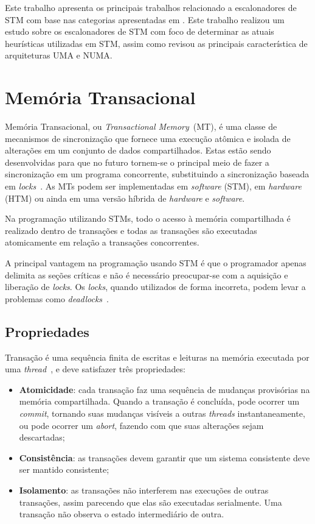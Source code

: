\documentclass[ti]{texufpel}
\begin{document}
Este trabalho apresenta os principais trabalhos relacionado a escalonadores de STM com base nas categorias apresentadas em \cite{sanzo17}. Este trabalho realizou um estudo sobre os escalonadores de STM com foco de determinar as atuais heurísticas utilizadas em STM, assim como revisou as principais característica de arquiteturas UMA e NUMA.

\chapter{Memória Transacional}

Memória Transacional, ou \emph{Transactional Memory}~(MT), é uma classe de mecanismos de sincronização que fornece uma execução atômica e isolada de alterações em um conjunto de dados compartilhados. Estas estão sendo desenvolvidas para que no futuro tornem-se o principal meio de fazer a sincronização em um programa concorrente, substituindo a sincronização baseada em \emph{locks}~\cite{herlihy06}. As MTs podem ser implementadas em \emph{software} (STM), em \emph{hardware} (HTM) ou ainda em uma versão híbrida de \emph{hardware} e \emph{software}.

Na programação utilizando STMs, todo o acesso à memória compartilhada é realizado dentro de transações e todas as transações são executadas atomicamente em relação a transações concorrentes.

A principal vantagem na programação usando STM é que o programador apenas delimita as seções críticas e não é necessário preocupar-se com a aquisição e liberação de \emph{locks}. Os \emph{locks}, quando utilizados de forma incorreta, podem levar a problemas como \emph{deadlocks}~\cite{bandeira10}.

\section{Propriedades}

Transação é uma sequência finita de escritas e leituras na memória executada por uma \emph{thread}~\cite{herlihy93}, e deve satisfazer três propriedades:

\begin{itemize}
\item \textbf{Atomicidade}: cada transação faz uma sequência de mudanças provisórias na memória compartilhada. Quando a transação é concluída, pode ocorrer um \emph{commit}, tornando suas mudanças visíveis a outras \emph{threads} instantaneamente, ou pode ocorrer um \emph{abort}, fazendo com que suas alterações sejam descartadas;

\item \textbf{Consistência}: as transações devem garantir que um sistema consistente deve ser mantido consistente;

\item \textbf{Isolamento}: as transações não interferem nas execuções de outras transações, assim parecendo que elas são executadas serialmente. Uma transação não observa o estado intermediário de outra.
\end{itemize}
\end{document}
